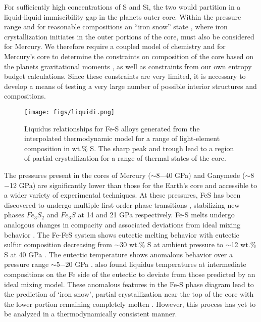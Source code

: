 For sufficiently high concentrations of S and Si, the two would partition in a
liquid-liquid immiscibility gap in the planets outer core. Within the pressure
range and for reasonable compositions an “iron snow” state
\citep{Chen2008,Williams2009}, where iron crystallization initiates in the outer portions of
the core, must also be considered for Mercury. We therefore require a
coupled model of chemistry and for Mercury’s core to determine the constraints
on composition of the core based on the planets gravitational moments
\citep{Smith2012}, as well as constraints from our own entropy budget calculations.
Since these constraints are very limited, it is necessary to develop a means of
testing a very large number of possible interior structures and compositions.

 \begin{figure}[h] %
   \centering
   \texttt{[image: figs/liquidi.png]} 
   \caption{Liquidus relationships for Fe-S alloys generated from the interpolated thermodynamic 
   model for a range of light-element composition in wt.\% S. The sharp peak and trough lead to 
   a region of partial crystallization for a range of thermal states of the core.}
   \label{fig:liquidi}
\end{figure}

The pressures present in the cores of Mercury ($\sim$8$-$40 GPa) and Ganymede
($\sim$8$-$12 GPa) are significantly lower than those for the Earth's core and
accessible to a wider variety of experimental techniques. At these pressures, 
FeS has been discovered to undergo multiple first-order phase transitions
\citep{Fei1997,Fei2000}, stabilizing new phases $Fe_3S_2$ and $Fe_3S$ at 14 and 21 GPa 
respectively. Fe-S melts undergo analogous changes in compacity
\citep{Morard2007} and associated deviations from ideal mixing behavior
\citep{Chen2008}. The Fe-FeS system shows eutectic melting behavior with eutectic
sulfur composition decreasing from $\sim$30 wt.\% S at ambient pressure to $\sim$12 
wt.\% S at 40 GPa \citep{Chudinovskikh2007}. The eutectic temperature shows
anomalous behavior over a pressure range $\sim$5$-$20 GPa \citep{Fei1997,Chen2008}.
\citet{Chen2008} also found liquidus temperatures at intermediate
compositions on the Fe side of the eutectic to deviate from those predicted by
an ideal mixing model. These anomalous features in the Fe-S phase diagram lead
to the prediction of `iron snow', partial crystallization near the top of the
core with the lower portion remaining completely molten \citep{Hauck2006,Chen2008}.
However, this process has yet to be analyzed in a thermodynamically consistent
manner.

